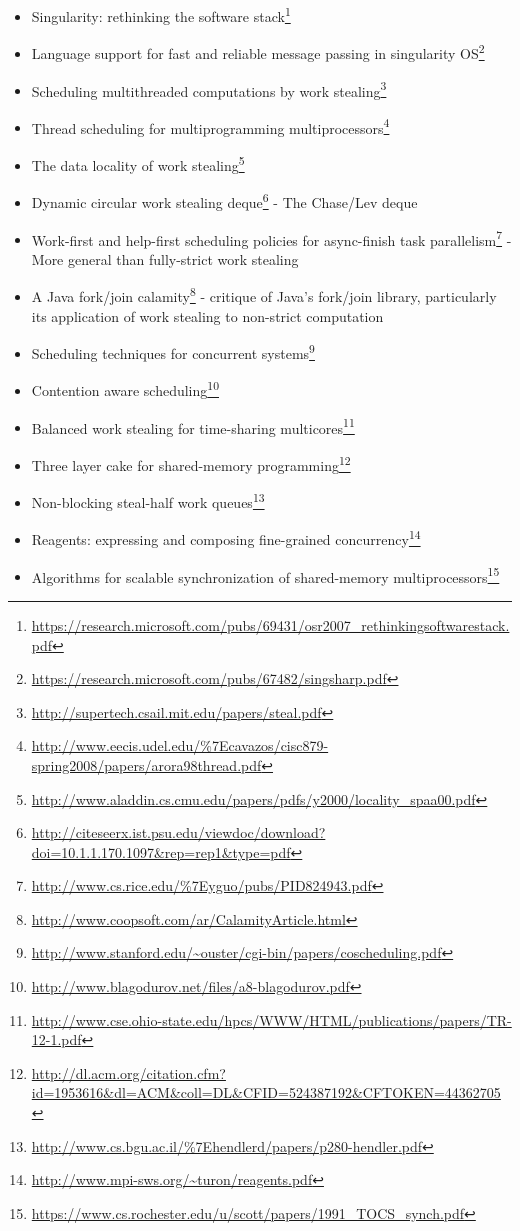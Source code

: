 \documentclass[a4paper,]{book}
\renewcommand{\href}[2]{#2\footnote{\url{#1}}}
\providecommand{\tightlist}{%
  \setlength{\itemsep}{0pt}\setlength{\parskip}{0pt}}
\begin{document}
\begin{itemize}
\tightlist
\item
  \href{https://research.microsoft.com/pubs/69431/osr2007_rethinkingsoftwarestack.pdf}{Singularity:
  rethinking the software stack}
\item
  \href{https://research.microsoft.com/pubs/67482/singsharp.pdf}{Language
  support for fast and reliable message passing in singularity OS}
\item
  \href{http://supertech.csail.mit.edu/papers/steal.pdf}{Scheduling
  multithreaded computations by work stealing}
\item
  \href{http://www.eecis.udel.edu/\%7Ecavazos/cisc879-spring2008/papers/arora98thread.pdf}{Thread
  scheduling for multiprogramming multiprocessors}
\item
  \href{http://www.aladdin.cs.cmu.edu/papers/pdfs/y2000/locality_spaa00.pdf}{The
  data locality of work stealing}
\item
  \href{http://citeseerx.ist.psu.edu/viewdoc/download?doi=10.1.1.170.1097\&rep=rep1\&type=pdf}{Dynamic
  circular work stealing deque} - The Chase/Lev deque
\item
  \href{http://www.cs.rice.edu/\%7Eyguo/pubs/PID824943.pdf}{Work-first
  and help-first scheduling policies for async-finish task parallelism}
  - More general than fully-strict work stealing
\item
  \href{http://www.coopsoft.com/ar/CalamityArticle.html}{A Java
  fork/join calamity} - critique of Java's fork/join library,
  particularly its application of work stealing to non-strict
  computation
\item
  \href{http://www.stanford.edu/~ouster/cgi-bin/papers/coscheduling.pdf}{Scheduling
  techniques for concurrent systems}
\item
  \href{http://www.blagodurov.net/files/a8-blagodurov.pdf}{Contention
  aware scheduling}
\item
  \href{http://www.cse.ohio-state.edu/hpcs/WWW/HTML/publications/papers/TR-12-1.pdf}{Balanced
  work stealing for time-sharing multicores}
\item
  \href{http://dl.acm.org/citation.cfm?id=1953616\&dl=ACM\&coll=DL\&CFID=524387192\&CFTOKEN=44362705}{Three
  layer cake for shared-memory programming}
\item
  \href{http://www.cs.bgu.ac.il/\%7Ehendlerd/papers/p280-hendler.pdf}{Non-blocking
  steal-half work queues}
\item
  \href{http://www.mpi-sws.org/~turon/reagents.pdf}{Reagents: expressing
  and composing fine-grained concurrency}
\item
  \href{https://www.cs.rochester.edu/u/scott/papers/1991_TOCS_synch.pdf}{Algorithms
  for scalable synchronization of shared-memory multiprocessors}
\end{itemize}
\end{document}
